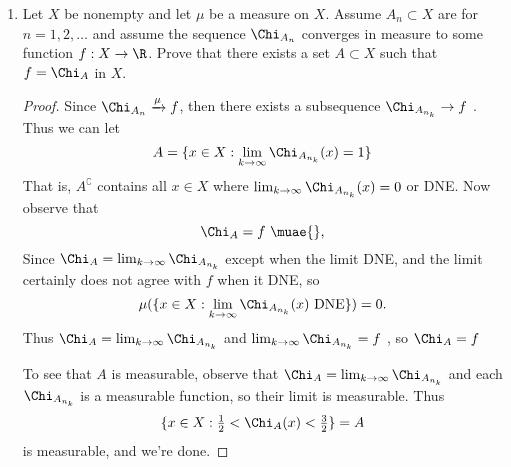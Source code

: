 \documentclass[12pt,letterpaper]{article}
\begin{document}
\begin{enumerate}
\begin{proof}
\begin{enumerate}[label=(\roman*)]
	\hspace{.55in}$\preimage{g}{-\infty, b} = \{x\in\R : g^+(x)-g^-(x)<b\}
	= \begin{cases}
	\preimage{(g^-)}{b,\infty}, & \text{if }b\leq0\\
	\preimage{(g^+)}{0,b}, & \text{if }b>0\\
	\end{cases}$
	
	which is a Borel set in either case. \qedhere
	\end{enumerate}
\end{proof}






\pagebreak
\item Let $X$ be nonempty and let $\mu$ be a measure on $X$. Assume $A_n \subset X$ are \mumeasurable{} for $n = 1, 2, \dots$ and assume the sequence $\Chi_{A_n}$ converges in measure to some function $f : X \to \R$. Prove that there exists a \mumeasurable{} set $A \subset X$ such that $f = \Chi_A$ \muae{} in $X$.
\begin{proof}
Since $\Chi_{A_n} \xrightarrow{\mu} f$, then there exists a subsequence $\Chi_{A_{n_k}} \to f$ \muae{}. Thus we can let 
$$A=\{x\in X : \lim_{k\to\infty} \Chi_{A_{n_k}}(x) = 1\}$$
That is, $A^\complement$ contains all $x\in X$ where $\lim_{k\to\infty} \Chi_{A_{n_k}}(x) = 0$ or DNE. Now observe that 
$$\Chi_A=f \text{ \muae{},}$$
Since $\Chi_A=\lim_{k\to\infty} \Chi_{A_{n_k}}$ except when the limit DNE, and the limit certainly does not agree with $f$ when it DNE, so 
$$\mu(\{x\in X : \lim_{k\to\infty} \Chi_{A_{n_k}}(x) \text{ DNE}\})=0.$$
Thus $\Chi_A = \lim_{k\to\infty} \Chi_{A_{n_k}}$ \muae{} and $\lim_{k\to\infty} \Chi_{A_{n_k}} = f$ \muae{}, so $\Chi_A = f$ \muae{}

To see that $A$ is measurable, observe that $\Chi_A = \lim_{k\to\infty} \Chi_{A_{n_k}}$ \muae	{} and each $\Chi_{A_{n_k}}$ is a measurable function, so their limit is measurable. Thus 
$$\{x\in X : \tfrac{1}{2} < \Chi_A(x) < \tfrac{3}{2} \}=A$$
is measurable, and we're done. 
\end{proof}


\end{enumerate}
\end{document}
